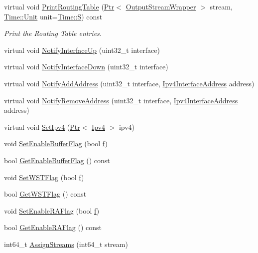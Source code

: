 \begin{DoxyCompactItemize}
\item 
virtual void \hyperlink{classns3_1_1dsdv_1_1RoutingProtocol_ac13b00f0a73404bebf2a6fccfea987d9}{Print\+Routing\+Table} (\hyperlink{classns3_1_1Ptr}{Ptr}$<$ \hyperlink{classns3_1_1OutputStreamWrapper}{Output\+Stream\+Wrapper} $>$ stream, \hyperlink{classns3_1_1Time_a87a7f4d29c68b047a72d291ad660295a}{Time\+::\+Unit} unit=\hyperlink{classns3_1_1Time_a87a7f4d29c68b047a72d291ad660295aade8622b06524a328cd3a59db6ccf76af}{Time\+::S}) const 
\begin{DoxyCompactList}\small\item\em Print the Routing Table entries. \end{DoxyCompactList}\item 
virtual void \hyperlink{classns3_1_1dsdv_1_1RoutingProtocol_a9a3edd95b3a0714d5aff5293e96883d2}{Notify\+Interface\+Up} (uint32\+\_\+t interface)
\item 
virtual void \hyperlink{classns3_1_1dsdv_1_1RoutingProtocol_a4c9154c20c88647918a2c0e144be6b4f}{Notify\+Interface\+Down} (uint32\+\_\+t interface)
\item 
virtual void \hyperlink{classns3_1_1dsdv_1_1RoutingProtocol_aaf6b464336448d3cf4e6370b00943253}{Notify\+Add\+Address} (uint32\+\_\+t interface, \hyperlink{classns3_1_1Ipv4InterfaceAddress}{Ipv4\+Interface\+Address} address)
\item 
virtual void \hyperlink{classns3_1_1dsdv_1_1RoutingProtocol_a27292ecea0925d440a272b57f1b96aab}{Notify\+Remove\+Address} (uint32\+\_\+t interface, \hyperlink{classns3_1_1Ipv4InterfaceAddress}{Ipv4\+Interface\+Address} address)
\item 
virtual void \hyperlink{classns3_1_1dsdv_1_1RoutingProtocol_aab88c62fbd0567cf31d185cb58b23a44}{Set\+Ipv4} (\hyperlink{classns3_1_1Ptr}{Ptr}$<$ \hyperlink{classns3_1_1Ipv4}{Ipv4} $>$ ipv4)
\item 
void \hyperlink{classns3_1_1dsdv_1_1RoutingProtocol_a4a3de094f750c655b3119a0111184b67}{Set\+Enable\+Buffer\+Flag} (bool \hyperlink{80211b_8c_ae7ffc1a8f84fa47a0812b2f2b9627132}{f})
\item 
bool \hyperlink{classns3_1_1dsdv_1_1RoutingProtocol_ac3de22557834f8656657afe95f2f523f}{Get\+Enable\+Buffer\+Flag} () const 
\item 
void \hyperlink{classns3_1_1dsdv_1_1RoutingProtocol_a7dc8bc0bba2c84dc1e50613d2f84f124}{Set\+W\+S\+T\+Flag} (bool \hyperlink{80211b_8c_ae7ffc1a8f84fa47a0812b2f2b9627132}{f})
\item 
bool \hyperlink{classns3_1_1dsdv_1_1RoutingProtocol_aa44017be461c04c8abf8ab04d5016d5e}{Get\+W\+S\+T\+Flag} () const 
\item 
void \hyperlink{classns3_1_1dsdv_1_1RoutingProtocol_a2c0b24d0c86af1c4d3d58cc0bea5c201}{Set\+Enable\+R\+A\+Flag} (bool \hyperlink{80211b_8c_ae7ffc1a8f84fa47a0812b2f2b9627132}{f})
\item 
bool \hyperlink{classns3_1_1dsdv_1_1RoutingProtocol_a7bee3dce5e8ef323300971c4e45e3d30}{Get\+Enable\+R\+A\+Flag} () const 
\item 
int64\+\_\+t \hyperlink{classns3_1_1dsdv_1_1RoutingProtocol_ad019a8702f1606a6a4c93d81af2aad64}{Assign\+Streams} (int64\+\_\+t stream)
\end{DoxyCompactItemize}
